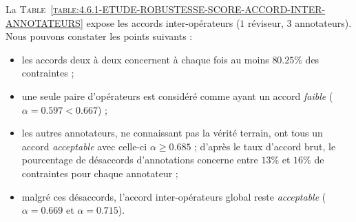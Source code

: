 			La \textsc{Table~\ref{table:4.6.1-ETUDE-ROBUSTESSE-SCORE-ACCORD-INTER-ANNOTATEURS}} expose les accords inter-opérateurs ($1$ réviseur, $3$ annotateurs).
			Nous pouvons constater les points suivants :
			\begin{itemize}
				\item les accords deux à deux concernent à chaque fois au moins $80.25$\% des contraintes ;
				\item une seule paire d'opérateurs est considéré comme ayant un accord \textit{faible} ($\alpha = 0.597 < 0.667$) ;
				\item les autres annotateurs, ne connaissant pas la vérité terrain, ont tous un accord \textit{acceptable} avec celle-ci $\alpha \geq 0.685$ ; d'après le taux d'accord brut, le pourcentage de désaccords d'annotations concerne entre $13$\% et $16$\% de contraintes pour chaque annotateur ;
				\item malgré ces désaccords, l'accord inter-opérateurs global reste \textit{acceptable} ($\alpha = 0.669$ et $\alpha = 0.715$).
			\end{itemize}
			
